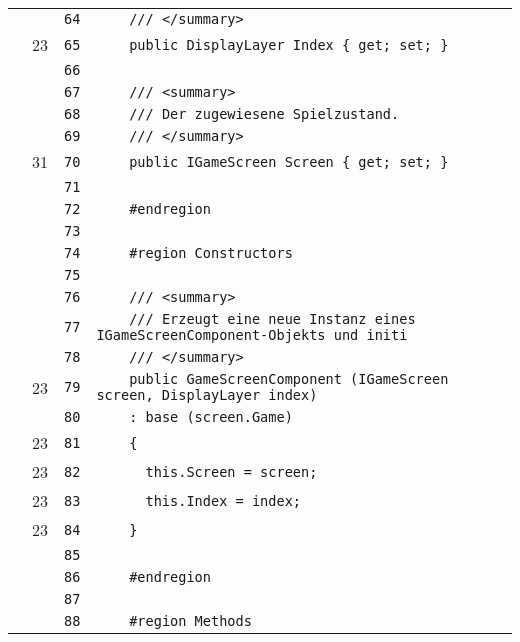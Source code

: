 \documentclass[a4paper,10pt]{article}
\begin{document}
\begin{longtable}[l]{lrrl}
\cellcolor{gray} &  & \verb~64~ & \verb~    /// </summary>~\\
\cellcolor{green} & 23 & \verb~65~ & \verb~    public DisplayLayer Index { get; set; }~\\
\cellcolor{gray} &  & \verb~66~ & \verb~~\\
\cellcolor{gray} &  & \verb~67~ & \verb~    /// <summary>~\\
\cellcolor{gray} &  & \verb~68~ & \verb~    /// Der zugewiesene Spielzustand.~\\
\cellcolor{gray} &  & \verb~69~ & \verb~    /// </summary>~\\
\cellcolor{green} & 31 & \verb~70~ & \verb~    public IGameScreen Screen { get; set; }~\\
\cellcolor{gray} &  & \verb~71~ & \verb~~\\
\cellcolor{gray} &  & \verb~72~ & \verb~    #endregion~\\
\cellcolor{gray} &  & \verb~73~ & \verb~~\\
\cellcolor{gray} &  & \verb~74~ & \verb~    #region Constructors~\\
\cellcolor{gray} &  & \verb~75~ & \verb~~\\
\cellcolor{gray} &  & \verb~76~ & \verb~    /// <summary>~\\
\cellcolor{gray} &  & \verb~77~ & \verb~    /// Erzeugt eine neue Instanz eines IGameScreenComponent-Objekts und initi~\\
\cellcolor{gray} &  & \verb~78~ & \verb~    /// </summary>~\\
\cellcolor{green} & 23 & \verb~79~ & \verb~    public GameScreenComponent (IGameScreen screen, DisplayLayer index)~\\
\cellcolor{gray} &  & \verb~80~ & \verb~    : base (screen.Game)~\\
\cellcolor{green} & 23 & \verb~81~ & \verb~    {~\\
\cellcolor{green} & 23 & \verb~82~ & \verb~      this.Screen = screen;~\\
\cellcolor{green} & 23 & \verb~83~ & \verb~      this.Index = index;~\\
\cellcolor{green} & 23 & \verb~84~ & \verb~    }~\\
\cellcolor{gray} &  & \verb~85~ & \verb~~\\
\cellcolor{gray} &  & \verb~86~ & \verb~    #endregion~\\
\cellcolor{gray} &  & \verb~87~ & \verb~~\\
\cellcolor{gray} &  & \verb~88~ & \verb~    #region Methods~\\

\end{longtable}
\end{document}
